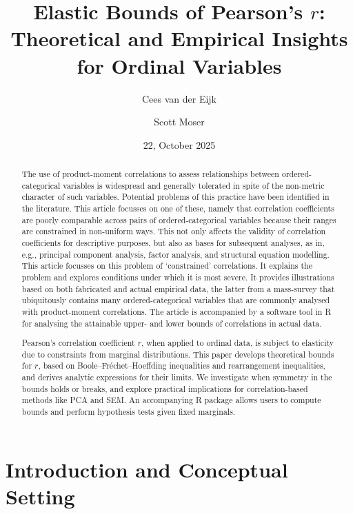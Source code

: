 \documentclass[
  12pt,
]{article}
\title{Elastic Bounds of Pearson's \(r\): Theoretical and Empirical
Insights for Ordinal Variables}
\author{Cees van der Eijk \and Scott Moser}
\date{22, October 2025}
\theoremstyle{plain}
\theoremstyle{definition}
\renewcommand*\contentsname{Table of contents}
\newcommand\contentsname{Table of contents}
\theoremstyle{remark}
\begin{document}
\maketitle

\renewcommand*\contentsname{Table of contents}
{
\hypersetup{linkcolor=}
\setcounter{tocdepth}{3}
\tableofcontents
}

\newpage

\begin{abstract}
The use of product-moment correlations to assess relationships between ordered-categorical variables is widespread and generally tolerated in spite of the non-metric character of such variables. Potential problems of this practice have been identified in the literature. This article focusses on one of these, namely that correlation coefficients are poorly comparable across pairs of ordered-categorical variables because their ranges are constrained in non-uniform ways. This not only affects the validity of correlation coefficients for descriptive purposes, but also as bases for subsequent analyses, as in, e.g., principal component analysis, factor analysis, and structural equation modelling. This article focusses on this problem of ‘constrained’ correlations. It explains the problem and explores conditions under which it is most severe. It provides illustrations based on both fabricated and actual empirical data, the latter from a mass-survey that ubiquitously contains many ordered-categorical variables that are commonly analysed with product-moment correlations. The article is accompanied by a software tool in R for analysing the attainable upper- and lower bounds of correlations in actual data. 

Pearson’s correlation coefficient $r$, when applied to ordinal data, is subject to elasticity due to constraints from marginal distributions. This paper develops theoretical bounds for $r$, based on Boole–Fréchet–Hoeffding inequalities and rearrangement inequalities, and derives analytic expressions for their limits. We investigate when symmetry in the bounds holds or breaks, and explore practical implications for correlation-based methods like PCA and SEM. An accompanying R package allows users to compute bounds and perform hypothesis tests given fixed marginals.
\end{abstract}

\newpage

\newpage

\section{Introduction and Conceptual
Setting}\label{introduction-and-conceptual-setting}
\end{document}

